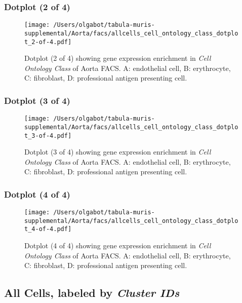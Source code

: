 \clearpage
\subsubsection{Dotplot (2 of 4)}
\begin{figure}[h]
\centering
\texttt{[image: /Users/olgabot/tabula-muris-supplemental/Aorta/facs/allcells\_cell\_ontology\_class\_dotplot\_2-of-4.pdf]}

\caption{ Dotplot (2 of 4)  showing gene expression enrichment in \emph{Cell Ontology Class} of Aorta FACS. A: endothelial cell, B: erythrocyte, C: fibroblast, D: professional antigen presenting cell.}
\end{figure}


\clearpage
\subsubsection{Dotplot (3 of 4)}
\begin{figure}[h]
\centering
\texttt{[image: /Users/olgabot/tabula-muris-supplemental/Aorta/facs/allcells\_cell\_ontology\_class\_dotplot\_3-of-4.pdf]}

\caption{ Dotplot (3 of 4)  showing gene expression enrichment in \emph{Cell Ontology Class} of Aorta FACS. A: endothelial cell, B: erythrocyte, C: fibroblast, D: professional antigen presenting cell.}
\end{figure}


\clearpage
\subsubsection{Dotplot (4 of 4)}
\begin{figure}[h]
\centering
\texttt{[image: /Users/olgabot/tabula-muris-supplemental/Aorta/facs/allcells\_cell\_ontology\_class\_dotplot\_4-of-4.pdf]}

\caption{ Dotplot (4 of 4)  showing gene expression enrichment in \emph{Cell Ontology Class} of Aorta FACS. A: endothelial cell, B: erythrocyte, C: fibroblast, D: professional antigen presenting cell.}
\end{figure}


\clearpage
\subsection{All Cells, labeled by \emph{Cluster IDs}}
